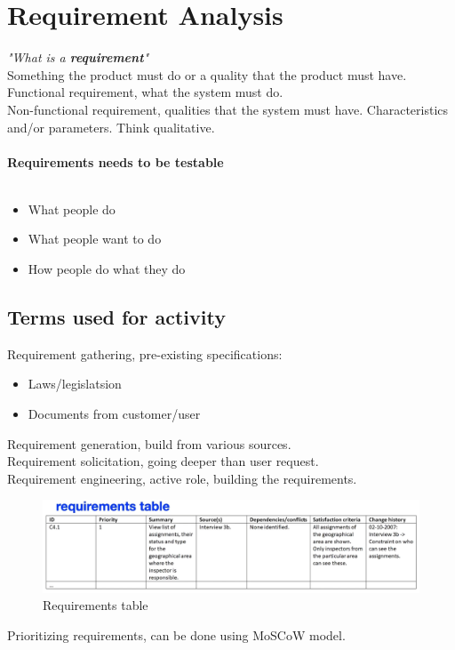 \chapter{Requirement Analysis}
\textit{"What is a \textbf{requirement}"}\\
Something the product must do or a quality that the product must have.\\
Functional requirement, what the system must do.\\
Non-functional requirement, qualities that the system must have. Characteristics and/or parameters. Think qualitative.\\\\
\textbf{Requirements needs to be testable}
\\\\
\begin{itemize}
    \item What people do
    \item What people want to do
    \item How people do what they do
\end{itemize}

\section{Terms used for activity}
Requirement gathering, pre-existing specifications:
\begin{itemize}
    \item Laws/legislatsion
    \item Documents from customer/user
\end{itemize}
Requirement generation, build from various sources.\\
Requirement solicitation, going deeper than user request.\\
Requirement engineering, active role, building the requirements.

\begin{figure}[H]
    \begin{center}
        \includegraphics*[width=\linewidth*3/4]{chapters/requirement_analysis/figures/requirement_table.png}        
    \end{center}
    \caption{Requirements table}
    \label{fig:requirement_table}
\end{figure}

Prioritizing requirements, can be done using MoSCoW model.
